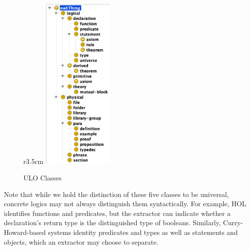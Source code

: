 \begin{figure}r{3.5cm}\vspace*{-2em}
  \includegraphics[width=3.5cm]{classes}\vspace*{.5em}
  \caption{ULO Classes}\label{fig:classes}\vspace*{-3em}
\end{figure}
Note that while we hold the distinction of these five classes to be universal, concrete logics may not always distinguish them syntactically.
For example, HOL identifies functions and predicates, but the extractor can indicate whether a declaration's return type is the distinguished type of booleans.
Similarly, Curry-Howard-based systems identity predicates and types as well as statements and objects, which an extractor may choose to separate.




